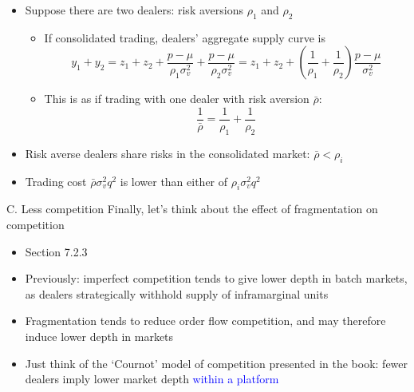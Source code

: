 \documentclass[english,10pt
,aspectratio=169
]{beamer}
\begin{document}
\begin{frame}{}
\begin{itemize}
\item Suppose there are two dealers: risk aversions $\rho_{1}$ and $\rho_{2}$
\begin{itemize}
\item If consolidated trading, dealers' aggregate supply curve is
\[
y_{1}+y_{2} = z_{1}+z_{2}+\frac{p-\mu}{\rho_{1}\sigma^{2}_{v}}+\frac{p-\mu}{\rho_{2} \sigma^{2}_{v}} =  z_{1}+z_{2}+\left(\frac{1}{\rho_1}+\frac{1}{\rho_2}\right)\frac{p-\mu}{\sigma^{2}_{v}}
\]
\item This is as if trading with one dealer with risk aversion $\bar{\rho}$:
\[
\frac{1}{\bar{\rho}}= \frac{1}{\rho_{1}} + \frac{1}{\rho_{2}}
\]
\end{itemize}
\end{itemize}
\begin{block}{}
\begin{itemize}
\item Risk averse dealers share risks in the consolidated market: $\bar{\rho}<\rho_{i}$
\item Trading cost $\bar{\rho}\sigma^{2}_{v}q^{2}$ is lower than either of $\rho_{i}\sigma^{2}_{v}q^{2}$
\end{itemize}
\end{block}
\end{frame}



\begin{frame}{C. Less competition}
Finally, let's think about the effect of fragmentation on competition
\begin{itemize}
\item Section 7.2.3
\item Previously: imperfect competition tends to give lower depth in batch markets, as dealers strategically withhold supply of inframarginal units
\item Fragmentation tends to reduce order flow competition, and may therefore induce lower depth in markets
\item Just think of the `Cournot' model of competition presented in the book: fewer dealers imply lower market depth \textcolor{blue}{within a platform}
\end{itemize}
\end{frame}
\end{document}
